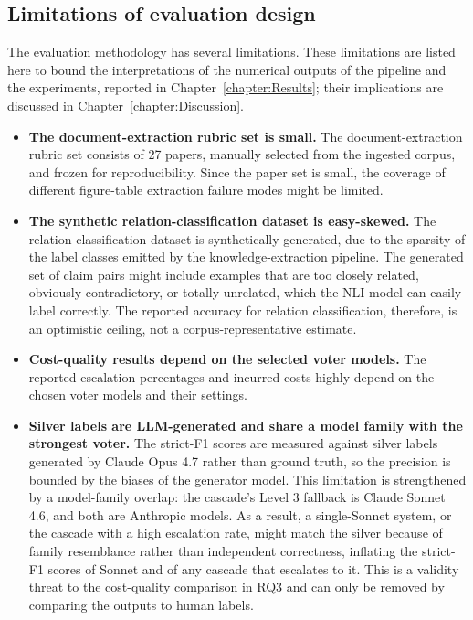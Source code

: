 \subsection{Limitations of evaluation design}\label{subsec:eval-limitations}

The evaluation methodology has several limitations. These limitations are listed here to bound the interpretations of the numerical outputs of the pipeline and the experiments, reported in Chapter~\ref{chapter:Results}; their implications are discussed in Chapter~\ref{chapter:Discussion}.

\begin{itemize}[label={},leftmargin=1.5em]
    \item \textbf{The document-extraction rubric set is small.} The document-extraction rubric set consists of 27 papers, manually selected from the ingested corpus, and frozen for reproducibility. Since the paper set is small, the coverage of different figure-table extraction failure modes might be limited.
    
    \item \textbf{The synthetic relation-classification dataset is easy-skewed.} The relation-classification dataset is synthetically generated, due to the sparsity of the label classes emitted by the knowledge-extraction pipeline. The generated set of claim pairs might include examples that are too closely related, obviously contradictory, or totally unrelated, which the NLI model can easily label correctly. The reported accuracy for relation classification, therefore, is an optimistic ceiling, not a corpus-representative estimate.
    
    \item \textbf{Cost-quality results depend on the selected voter models.} The reported escalation percentages and incurred costs highly depend on the chosen voter models and their settings.

    \item \textbf{Silver labels are LLM-generated and share a model family with the strongest voter.} The strict-F1 scores are measured against silver labels generated by Claude Opus 4.7 rather than ground truth, so the precision is bounded by the biases of the generator model. This limitation is strengthened by a model-family overlap: the cascade's Level 3 fallback is Claude Sonnet 4.6, and both are Anthropic models. As a result, a single-Sonnet system, or the cascade with a high escalation rate, might match the silver because of family resemblance rather than independent correctness, inflating the strict-F1 scores of Sonnet and of any cascade that escalates to it. This is a validity threat to the cost-quality comparison in RQ3 and can only be removed by comparing the outputs to human labels.
    

\end{itemize}
